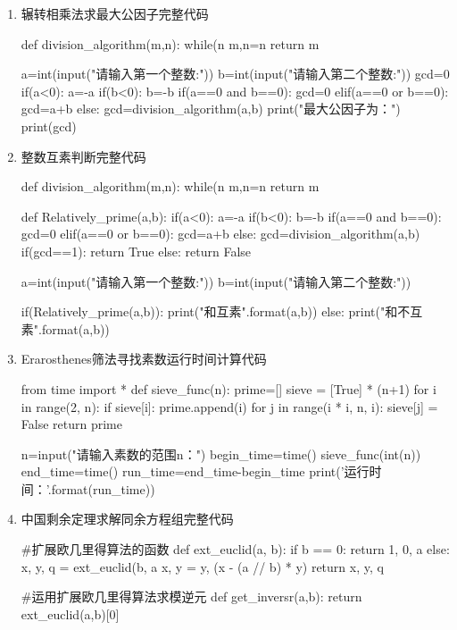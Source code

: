 \documentclass[UTF8]{ctexart}
\begin{document}
\begin{enumerate}[(1)]
\item 辗转相乘法求最大公因子完整代码
\begin{python}
  def division_algorithm(m,n):
      while(n%
          m,n=n%
      return m

  a=int(input("请输入第一个整数:"))
  b=int(input("请输入第二个整数:"))
  gcd=0
  if(a<0):
      a=-a
  if(b<0):
      b=-b
  if(a==0 and b==0):
      gcd=0
  elif(a==0 or b==0):
      gcd=a+b
  else:
      gcd=division_algorithm(a,b)
  print("最大公因子为：")
  print(gcd)
\end{python}
\item 整数互素判断完整代码
\begin{python}
def division_algorithm(m,n):
  while(n%
      m,n=n%
  return m

def Relatively_prime(a,b):
  if(a<0):
      a=-a
  if(b<0):
      b=-b
  if(a==0 and b==0):
      gcd=0
  elif(a==0 or b==0):
      gcd=a+b
  else:
      gcd=division_algorithm(a,b)
  if(gcd==1):
      return True
  else: return False

a=int(input("请输入第一个整数:"))
b=int(input("请输入第二个整数:"))

if(Relatively_prime(a,b)):
  print("{}和{}互素".format(a,b))
else: 
  print("{}和{}不互素".format(a,b))

\end{python}
\item Erarosthenes筛法寻找素数运行时间计算代码
\begin{python}
  from time import *
  def sieve_func(n):
      prime=[]
      sieve = [True] * (n+1)
      for i in range(2, n):
          if sieve[i]:
              prime.append(i)
              for j in range(i * i, n, i):
                  sieve[j] = False
      return prime
  
  n=input("请输入素数的范围n：")
  begin_time=time()
  sieve_func(int(n))
  end_time=time()
  run_time=end_time-begin_time
  print('运行时间：{}'.format(run_time))
\end{python}
\item 中国剩余定理求解同余方程组完整代码
\begin{python}
#扩展欧几里得算法的函数
def ext_euclid(a, b):     
    if b == 0:         
        return 1, 0, a     
    else:         
        x, y, q = ext_euclid(b, a %
        x, y = y, (x - (a // b) * y)         
        return x, y, q

#运用扩展欧几里得算法求模逆元
def get_inversr(a,b):
    return ext_euclid(a,b)[0]


\end{python}
\end{enumerate}
\end{document}
